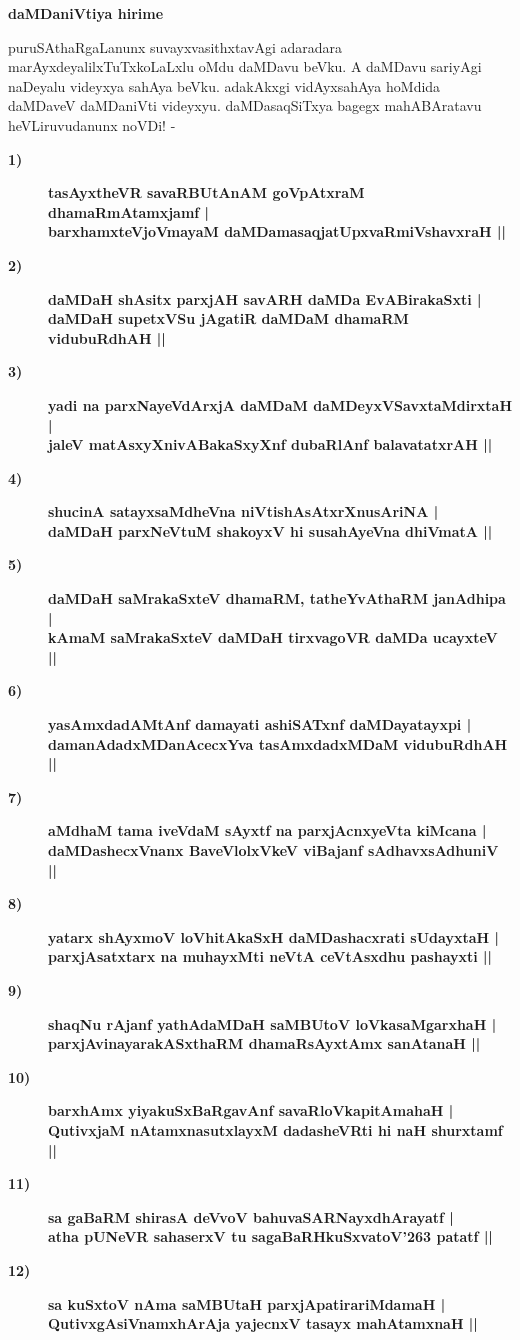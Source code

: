 {\bigskip
\noindent
{\large\bf daMDaniVtiya hirime}}\label{page96a}
\medskip

\noindent
puruSAthaRgaLanunx suvayxvasithxtavAgi adaradara marAyxdeyalilxTuTxkoLaLxlu oMdu daMDavu beVku. A daMDavu sariyAgi naDeyalu videyxya sahAya beVku. adakAkxgi vidAyxsahAya hoMdida daMDaveV daMDaniVti videyxyu. daMDasaqSiTxya bagegx mahABAratavu heVLiruvudanunx noVDi! -

\begin{description}
\item [\bf 1)] {\bf tasAyxtheVR savaRBUtAnAM goVpAtxraM dhamaRmAtamxjamf |}\\\label{96a} 
{\bf barxhamxteVjoVmayaM daMDamasaqjatUpxvaRmiVshavxraH ||}
\item [\bf 2)] {\bf daMDaH shAsitx parxjAH savARH daMDa EvABirakaSxti |}\\ 
{\bf daMDaH supetxVSu jAgatiR daMDaM dhamaRM vidubuRdhAH ||}
\item [\bf 3)] {\bf yadi na parxNayeVdArxjA daMDaM daMDeyxVSavxtaMdirxtaH |}\\ 
{\bf jaleV matAsxyXnivABakaSxyXnf dubaRlAnf balavatatxrAH ||}
\item [\bf 4)] {\bf shucinA satayxsaMdheVna niVtishAsAtxrXnusAriNA |}\\ 
{\bf daMDaH parxNeVtuM shakoyxV hi susahAyeVna dhiVmatA ||}

\item [\bf 5)] {\bf daMDaH saMrakaSxteV dhamaRM, tatheYvAthaRM janAdhipa |}\\
{\bf  kAmaM saMrakaSxteV daMDaH tirxvagoVR daMDa ucayxteV ||}
\item [\bf 6)] {\bf yasAmxdadAMtAnf damayati ashiSATxnf daMDayatayxpi |}\\ 
{\bf damanAdadxMDanAcecxYva tasAmxdadxMDaM vidubuRdhAH ||}
\item [\bf 7)] {\bf aMdhaM tama iveVdaM sAyxtf na parxjAcnxyeVta kiMcana |}\\ 
{\bf daMDashecxVnanx BaveVlolxVkeV viBajanf sAdhavxsAdhuniV ||}
\item [\bf 8)] {\bf yatarx shAyxmoV loVhitAkaSxH daMDashacxrati sUdayxtaH |}\\ 
{\bf parxjAsatxtarx na muhayxMti neVtA ceVtAsxdhu pashayxti ||}
\item [\bf 9)] {\bf shaqNu rAjanf yathAdaMDaH saMBUtoV loVkasaMgarxhaH |}\\ 
{\bf parxjAvinayarakASxthaRM dhamaRsAyxtAmx sanAtanaH ||}
\item [\bf 10)] {\bf barxhAmx yiyakuSxBaRgavAnf savaRloVkapitAmahaH |}\\ 
{\bf QutivxjaM nAtamxnasutxlayxM dadasheVRti hi naH shurxtamf ||}
\item [\bf 11)] {\bf sa gaBaRM shirasA deVvoV bahuvaSARNayxdhArayatf |}\\
{\bf  atha pUNeVR sahaserxV tu sagaBaRHkuSxvatoV\char'263 patatf ||}
\item [\bf 12)] {\bf sa kuSxtoV nAma saMBUtaH parxjApatirariMdamaH |}\\ 
{\bf QutivxgAsiVnamxhArAja yajecnxV tasayx mahAtamxnaH ||}


\end{description}
